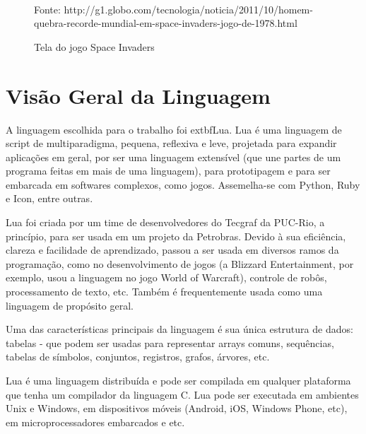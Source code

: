 \documentclass[rel_mlp]{iiufrgs}
\newcommand{\fonte}[1]{\\Fonte: {#1}}
\begin{document}
\begin{figure}[H]
     \centering
     \caption{Tela do jogo Space Invaders}
     \label{fig:figura1}
     \fonte{http://g1.globo.com/tecnologia/noticia/2011/10/homem-quebra-recorde-mundial-em-space-invaders-jogo-de-1978.html}
 \end{figure}


\chapter{Visão Geral da Linguagem}

A linguagem escolhida para o trabalho foi extbf{Lua}. Lua é uma linguagem de script de multiparadigma, pequena, reflexiva e leve, projetada para expandir aplicações em geral, por ser uma linguagem extensível (que une partes de um programa feitas em mais de uma linguagem), para prototipagem e para ser embarcada em softwares complexos, como jogos. Assemelha-se com Python, Ruby e Icon, entre outras.

Lua foi criada por um time de desenvolvedores do Tecgraf da PUC-Rio, a princípio, para ser usada em um projeto da Petrobras. Devido à sua eficiência, clareza e facilidade de aprendizado, passou a ser usada em diversos ramos da programação, como no desenvolvimento de jogos (a Blizzard Entertainment, por exemplo, usou a linguagem no jogo World of Warcraft), controle de robôs, processamento de texto, etc. Também é frequentemente usada como uma linguagem de propósito geral.

Uma das características principais da linguagem é sua única estrutura de dados: tabelas - que podem ser usadas para representar arrays comuns, sequências, tabelas de símbolos, conjuntos, registros, grafos, árvores, etc.

Lua é uma linguagem distribuída e pode ser compilada em qualquer plataforma que tenha um compilador da linguagem C. Lua pode ser executada em ambientes Unix e Windows, em dispositivos móveis (Android, iOS, Windows Phone, etc), em microprocessadores embarcados e etc.
\end{document}

